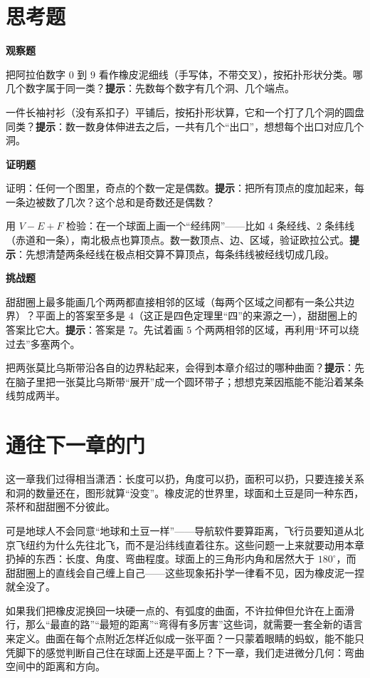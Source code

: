 \section*{思考题}

\textbf{观察题}

\begin{sikao}
  \item 把阿拉伯数字 $0$ 到 $9$ 看作橡皮泥细线（手写体，不带交叉），按拓扑形状分类。哪几个数字属于同一类？\textbf{提示}：先数每个数字有几个洞、几个端点。
  \item 一件长袖衬衫（没有系扣子）平铺后，按拓扑形状算，它和一个打了几个洞的圆盘同类？\textbf{提示}：数一数身体伸进去之后，一共有几个“出口”，想想每个出口对应几个洞。
\end{sikao}

\textbf{证明题}

\begin{sikao}
  \item 证明：任何一个图里，奇点的个数一定是偶数。\textbf{提示}：把所有顶点的度加起来，每一条边被数了几次？这个总和是奇数还是偶数？
  \item 用 $V-E+F$ 检验：在一个球面上画一个“经纬网”——比如 $4$ 条经线、$2$ 条纬线（赤道和一条），南北极点也算顶点。数一数顶点、边、区域，验证欧拉公式。\textbf{提示}：先想清楚两条经线在极点相交算不算顶点，每条纬线被经线切成几段。
\end{sikao}

\textbf{挑战题}

\begin{sikao}
  \item 甜甜圈上最多能画几个两两都直接相邻的区域（每两个区域之间都有一条公共边界）？平面上的答案至多是 $4$（这正是四色定理里“四”的来源之一），甜甜圈上的答案比它大。\textbf{提示}：答案是 $7$。先试着画 $5$ 个两两相邻的区域，再利用“环可以绕过去”多塞两个。
  \item 把两张莫比乌斯带沿各自的边界粘起来，会得到本章介绍过的哪种曲面？\textbf{提示}：先在脑子里把一张莫比乌斯带“展开”成一个圆环带子；想想克莱因瓶能不能沿着某条线剪成两半。
\end{sikao}

\section*{通往下一章的门}

这一章我们过得相当潇洒：长度可以扔，角度可以扔，面积可以扔，只要连接关系和洞的数量还在，图形就算“没变”。橡皮泥的世界里，球面和土豆是同一种东西，茶杯和甜甜圈不分彼此。

可是地球人不会同意“地球和土豆一样”——导航软件要算距离，飞行员要知道从北京飞纽约为什么先往北飞，而不是沿纬线直着往东。这些问题一上来就要动用本章扔掉的东西：长度、角度、弯曲程度。球面上的三角形内角和居然大于 $180^{\circ}$，而甜甜圈上的直线会自己缠上自己——这些现象拓扑学一律看不见，因为橡皮泥一捏就全没了。

如果我们把橡皮泥换回一块硬一点的、有弧度的曲面，不许拉伸但允许在上面滑行，那么“最直的路”“最短的距离”“弯得有多厉害”这些词，就需要一套全新的语言来定义。曲面在每个点附近怎样近似成一张平面？一只蒙着眼睛的蚂蚁，能不能只凭脚下的感觉判断自己住在球面上还是平面上？下一章，我们走进微分几何：弯曲空间中的距离和方向。
